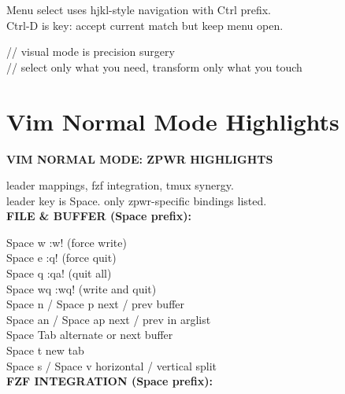 \documentclass[11pt,a4paper,twoside]{book}
\begin{document}
Menu select uses hjkl-style navigation with Ctrl prefix.\\
Ctrl-D is key: accept current match but keep menu open.\\

\begin{codebox}
\color{neongreen}// visual mode is precision surgery\\
\color{neongreen}// select only what you need, transform only what you touch\\
\end{codebox}


\vspace{16pt}

\section{Vim Normal Mode Highlights}


\vspace{10pt}
{\large\bfseries\color{neoncyan} VIM NORMAL MODE: ZPWR HIGHLIGHTS}\vspace{6pt}

leader mappings, fzf integration, tmux synergy.\\
leader key is Space. only zpwr-specific bindings listed.\\


\vspace{12pt}
{\bfseries\color{neonyellow} FILE \& BUFFER (Space prefix):}\vspace{4pt}

Space w               :w! (force write)\\
Space e               :q! (force quit)\\
Space q               :qa! (quit all)\\
Space wq              :wq! (write and quit)\\
Space n / Space p     next / prev buffer\\
Space an / Space ap   next / prev in arglist\\
Space Tab             alternate or next buffer\\
Space t               new tab\\
Space s / Space v     horizontal / vertical split\\


\vspace{12pt}
{\bfseries\color{neonyellow} FZF INTEGRATION (Space prefix):}\vspace{4pt}
\end{document}
